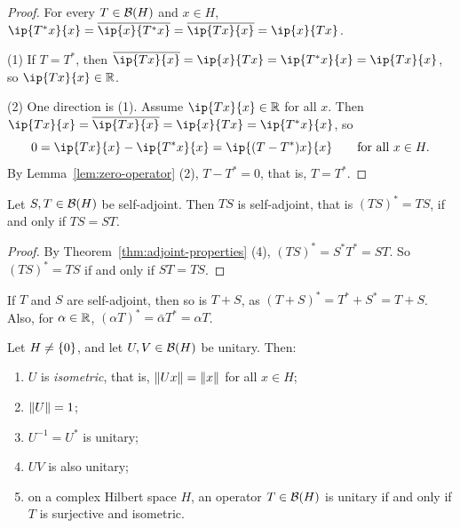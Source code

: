 \begin{proof}
For every $T \in \mathcal{B}(H)$ and $x \in H$,
$\ip{T^* x}{x} = \overline{\ip{x}{T^* x}} = \overline{\ip{Tx}{x}}
= \ip{x}{Tx}$.

(1) If $T = T^*$, then
$\overline{\ip{Tx}{x}} = \ip{x}{Tx} = \ip{T^* x}{x} = \ip{Tx}{x}$, so
$\ip{Tx}{x} \in \R$.

(2) One direction is (1). Assume $\ip{Tx}{x} \in \R$ for all $x$. Then
$\ip{Tx}{x} = \overline{\ip{Tx}{x}} = \ip{x}{Tx} = \ip{T^* x}{x}$, so
\[
  0 = \ip{Tx}{x} - \ip{T^* x}{x} = \ip{(T - T^*)x}{x}
  \qquad \text{for all } x \in H .
\]
By Lemma~\ref{lem:zero-operator} (2), $T - T^* = 0$, that is, $T = T^*$.
\end{proof}

\begin{theorem}\label{thm:product-self-adjoint}
Let $S, T \in \mathcal{B}(H)$ be self-adjoint. Then $TS$ is self-adjoint, that
is $(TS)^* = TS$, if and only if $TS = ST$.
\end{theorem}

\begin{proof}
By Theorem~\ref{thm:adjoint-properties} (4), $(TS)^* = S^* T^* = ST$. So
$(TS)^* = TS$ if and only if $ST = TS$.
\end{proof}

\begin{remark}
If $T$ and $S$ are self-adjoint, then so is $T + S$, as
$(T + S)^* = T^* + S^* = T + S$. Also, for $\alpha \in \mathbb{R}$,
$(\alpha T)^* = \bar{\alpha} T^* = \alpha T$.
\end{remark}

\begin{theorem}\label{thm:unitary}
Let $H \ne \{0\}$, and let $U, V \in \mathcal{B}(H)$ be unitary. Then:
\begin{enumerate}
  \item $U$ is \emph{isometric}, that is, $\lVert Ux\rVert = \lVert x\rVert$ for all
    $x \in H$;
  \item $\lVert U\rVert = 1$;
  \item $U^{-1} = U^*$ is unitary;
  \item $UV$ is also unitary;
  \item on a complex Hilbert space $H$, an operator $T \in \mathcal{B}(H)$ is
    unitary if and only if $T$ is surjective and isometric.
\end{enumerate}
\end{theorem}

